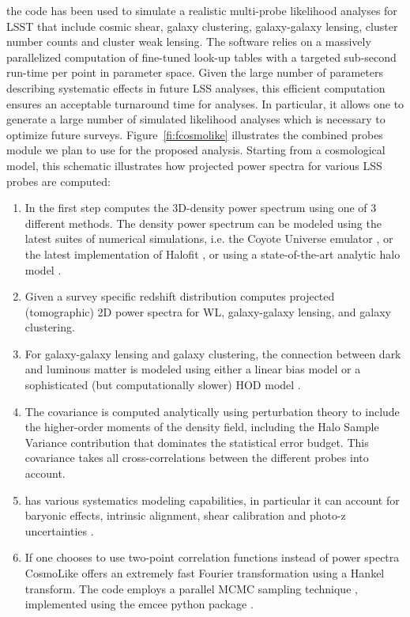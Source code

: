 the code has been used to simulate a realistic multi-probe likelihood analyses for LSST \citep{Krause2017} that include cosmic shear, galaxy clustering, galaxy-galaxy lensing, cluster number counts and cluster weak lensing.
The software relies on a massively parallelized computation of fine-tuned look-up tables with a targeted sub-second run-time per point in parameter space. Given the large number of parameters describing systematic effects in future LSS analyses, this efficient computation ensures an acceptable turnaround time for analyses. In particular, it allows one to generate a large number of simulated likelihood analyses which is necessary to optimize future surveys. Figure~\ref{fi:fcosmolike}
illustrates the \CoLi combined probes module we plan to use for the proposed analysis. Starting from a cosmological model, this schematic illustrates how projected power spectra for various LSS probes are computed:
\begin{enumerate}
\item In the first step \CoLi computes the 3D-density power spectrum using one of 3 different methods. The density power spectrum can be modeled using the latest suites of numerical simulations, i.e. the Coyote Universe emulator \citep{Heitmann2014}, or the latest implementation of Halofit \citep{tsn12}, or using a state-of-the-art analytic halo model \citep{Krause2013}.
\item Given a survey specific redshift distribution \CoLi computes projected (tomographic) 2D power spectra for WL, galaxy-galaxy lensing, and galaxy clustering.
\item  For galaxy-galaxy lensing and galaxy clustering, the connection between dark and luminous matter is modeled using either a linear bias model or a sophisticated (but computationally slower) HOD model \citep{Krause2013}.
\item The covariance is computed analytically using perturbation theory to include the higher-order moments of the density field, including the Halo Sample Variance contribution that dominates the statistical error budget. This covariance takes all cross-correlations between the different probes into account.
\item \CoLi has various systematics modeling capabilities, in particular it can account for baryonic effects, intrinsic alignment, shear calibration and photo-z uncertainties \citep{Eifler2015, Krause2016, Krause2017}.
\item If one chooses to use two-point correlation functions instead of power spectra CosmoLike offers an extremely fast Fourier transformation using a Hankel transform. The code employs a parallel MCMC sampling technique \citep{Goodman2010}, implemented using the emcee python package \citep{Foreman-Mackey2013}.
\end{enumerate}


